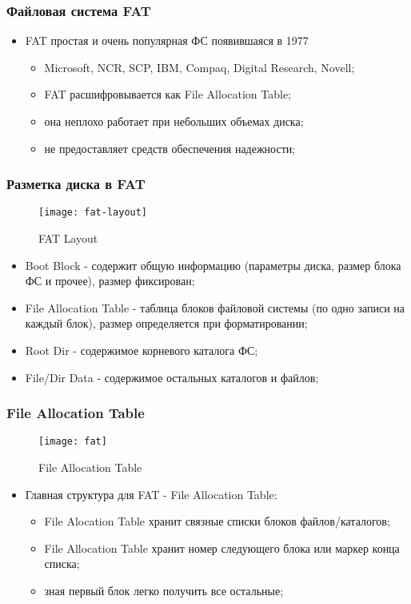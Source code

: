 \begin{frame}
\frametitle{Файловая система FAT}
\begin{itemize}
  \item FAT простая и очень популярная ФС появившаяся в 1977
    \begin{itemize}
      \item Microsoft, NCR, SCP, IBM, Compaq, Digital Research, Novell;
      \item FAT расшифровывается как File Allocation Table;
      \item она неплохо работает при небольших объемах диска;
      \item не предоставляет средств обеспечения надежности;
    \end{itemize}
\end{itemize}
\end{frame}

\begin{frame}
\frametitle{Разметка диска в FAT}
\begin{figure}
  \centering\texttt{[image: fat-layout]}
  \caption{FAT Layout}
\end{figure}
\begin{itemize}
  \item Boot Block - содержит общую информацию (параметры диска, размер блока ФС и прочее), размер фиксирован;
  \item File Allocation Table - таблица блоков файловой системы (по одно записи на каждый блок), размер определяется при форматировании;
  \item Root Dir - содержимое корневого каталога ФС;
  \item File/Dir Data - содержимое остальных каталогов и файлов;
\end{itemize}
\end{frame}

\begin{frame}
\frametitle{File Allocation Table}
\begin{figure}
  \centering\texttt{[image: fat]}
  \caption{File Allocation Table}
\end{figure}
\begin{itemize}
  \item Главная структура для FAT - File Allocation Table:
    \begin{itemize}
      \item File Alocation Table хранит связные списки блоков файлов/каталогов;
      \item File Allocation Table хранит номер следующего блока или маркер конца списка;
      \item зная первый блок легко получить все остальные;
    \end{itemize}
\end{itemize}
\end{frame}


